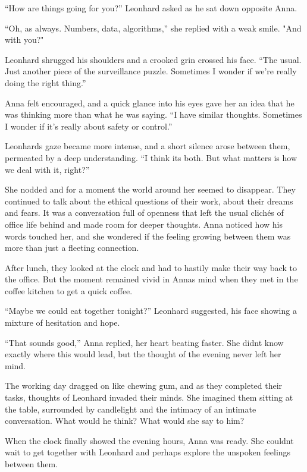 \documentclass[
]{article}
\begin{document}
``How are things going for you?'' Leonhard asked as he sat down opposite
Anna.

``Oh, as always. Numbers, data, algorithms,'' she replied with a weak
smile. "And with you?"

Leonhard shrugged his shoulders and a crooked grin crossed his face.
``The usual. Just another piece of the surveillance puzzle. Sometimes I
wonder if we're really doing the right thing.''

Anna felt encouraged, and a quick glance into his eyes gave her an idea
that he was thinking more than what he was saying. ``I have similar
thoughts. Sometimes I wonder if it's really about safety or control.''

Leonhard\textquotesingle s gaze became more intense, and a short silence
arose between them, permeated by a deep understanding. ``I think
it\textquotesingle s both. But what matters is how we deal with it,
right?''

She nodded and for a moment the world around her seemed to disappear.
They continued to talk about the ethical questions of their work, about
their dreams and fears. It was a conversation full of openness that left
the usual clichés of office life behind and made room for deeper
thoughts. Anna noticed how his words touched her, and she wondered if
the feeling growing between them was more than just a fleeting
connection.

After lunch, they looked at the clock and had to hastily make their way
back to the office. But the moment remained vivid in
Anna\textquotesingle s mind when they met in the coffee kitchen to get a
quick coffee.

``Maybe we could eat together tonight?'' Leonhard suggested, his face
showing a mixture of hesitation and hope.

``That sounds good,'' Anna replied, her heart beating faster. She
didn\textquotesingle t know exactly where this would lead, but the
thought of the evening never left her mind.

The working day dragged on like chewing gum, and as they completed their
tasks, thoughts of Leonhard invaded their minds. She imagined them
sitting at the table, surrounded by candlelight and the intimacy of an
intimate conversation. What would he think? What would she say to him?

When the clock finally showed the evening hours, Anna was ready. She
couldn\textquotesingle t wait to get together with Leonhard and perhaps
explore the unspoken feelings between them.
\end{document}
